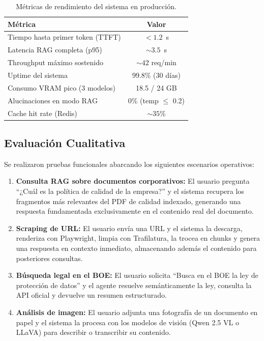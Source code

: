 \begin{table}[H]
\centering
\caption{Métricas de rendimiento del sistema en producción.}
\label{tab:metricas}
\begin{tabular}{lc}
\toprule
\textbf{Métrica} & \textbf{Valor} \\
\midrule
Tiempo hasta primer token (TTFT) & $< 1.2$~s \\
Latencia RAG completa (p95)       & $\sim 3.5$~s \\
Throughput máximo sostenido       & $\sim 42$ req/min \\
Uptime del sistema                & 99.8\% (30 días) \\
Consumo VRAM pico (3 modelos)     & 18.5 / 24 GB \\
Alucinaciones en modo RAG         & 0\% (temp $\leq$ 0.2) \\
Cache hit rate (Redis)            & $\sim 35$\% \\
\bottomrule
\end{tabular}
\end{table}

\subsection{Evaluación Cualitativa}
Se realizaron pruebas funcionales abarcando los siguientes escenarios operativos:

\begin{enumerate}
    \item \textbf{Consulta RAG sobre documentos corporativos:} El usuario pregunta ``¿Cuál es la política de calidad de la empresa?'' y el sistema recupera los fragmentos más relevantes del PDF de calidad indexado, generando una respuesta fundamentada exclusivamente en el contenido real del documento.
    \item \textbf{Scraping de URL:} El usuario envía una URL y el sistema la descarga, renderiza con Playwright, limpia con Trafilatura, la trocea en chunks y genera una respuesta en contexto inmediato, almacenando además el contenido para posteriores consultas.
    \item \textbf{Búsqueda legal en el BOE:} El usuario solicita ``Busca en el BOE la ley de protección de datos'' y el agente resuelve semánticamente la ley, consulta la API oficial y devuelve un resumen estructurado.
    \item \textbf{Análisis de imagen:} El usuario adjunta una fotografía de un documento en papel y el sistema la procesa con los modelos de visión (Qwen 2.5 VL o LLaVA) para describir o transcribir su contenido.
\end{enumerate}

